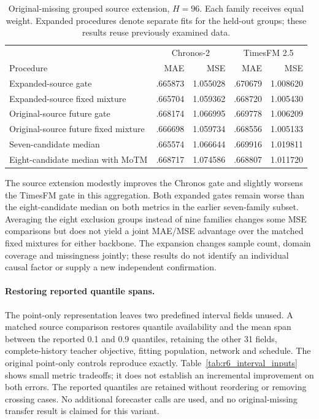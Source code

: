 \begin{table}[ht]
\centering
\small
\caption{Original-missing grouped source extension, $H=96$. Each family receives equal weight. Expanded procedures denote separate fits for the held-out groups; these results reuse previously examined data.}
\label{tab:r6_native_source_extension}
\begin{tabular}{lrrrr}
\toprule
 & \multicolumn{2}{c}{Chronos-2} & \multicolumn{2}{c}{TimesFM 2.5}\\
Procedure & MAE & MSE & MAE & MSE\\
\midrule
Expanded-source gate & .665873 & 1.055028 & .670679 & 1.008620\\
Expanded-source fixed mixture & .665704 & 1.059362 & .668720 & 1.005430\\
Original-source future gate & .668174 & 1.066995 & .669778 & 1.006209\\
Original-source future fixed mixture & .666698 & 1.059734 & .668556 & 1.005133\\
Seven-candidate median & .665574 & 1.066644 & .669916 & 1.019811\\
Eight-candidate median with MoTM & .668717 & 1.074586 & .668807 & 1.011720\\
\bottomrule
\end{tabular}
\end{table}

The source extension modestly improves the Chronos gate and slightly worsens the TimesFM gate in this aggregation. Both expanded gates remain worse than the eight-candidate median on both metrics in the earlier seven-family subset. Averaging the eight exclusion groups instead of nine families changes some MSE comparisons but does not yield a joint MAE/MSE advantage over the matched fixed mixtures for either backbone. The expansion changes sample count, domain coverage and missingness jointly; these results do not identify an individual causal factor or supply a new independent confirmation.

\clearpage
\paragraph{Restoring reported quantile spans.}
The point-only representation leaves two predefined interval fields unused. A matched source comparison restores quantile availability and the mean span between the reported 0.1 and 0.9 quantiles, retaining the other 31 fields, complete-history teacher objective, fitting population, network and schedule. The original point-only controls reproduce exactly. Table~\ref{tab:r6_interval_inputs} shows small metric tradeoffs; it does not establish an incremental improvement on both errors. The reported quantiles are retained without reordering or removing crossing cases. No additional forecaster calls are used, and no original-missing transfer result is claimed for this variant.

